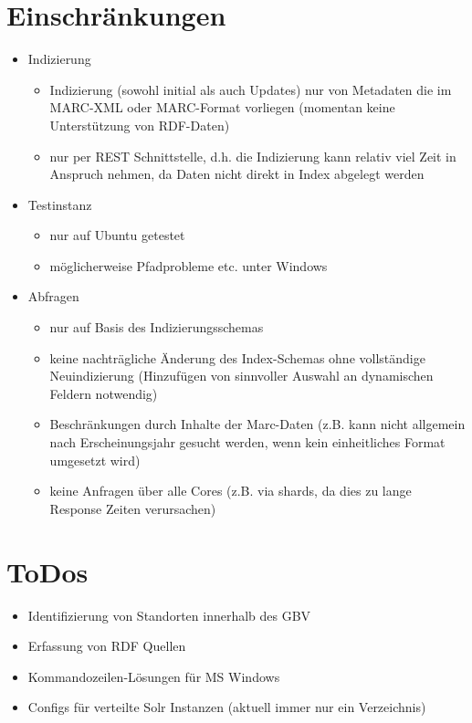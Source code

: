\documentclass[10pt]{article}
\begin{document}
\section{Einschränkungen}
\begin{itemize}
	\item Indizierung
	\begin{itemize}
		\item Indizierung (sowohl initial als auch Updates) nur von Metadaten die im MARC-XML oder MARC-Format vorliegen (momentan keine Unterstützung von RDF-Daten)
		\item nur per REST Schnittstelle, d.h. die Indizierung kann relativ viel Zeit in Anspruch nehmen, da Daten nicht direkt in Index abgelegt werden
	\end{itemize}
	
	
	\item Testinstanz
	\begin{itemize}
		\item nur auf Ubuntu getestet
		\item möglicherweise Pfadprobleme etc. unter Windows
	\end{itemize}
	
	\item Abfragen
	\begin{itemize}
		\item nur auf Basis des Indizierungsschemas %
		\item keine nachträgliche Änderung des Index-Schemas ohne vollständige Neuindizierung (Hinzufügen von sinnvoller Auswahl an dynamischen Feldern notwendig)
		\item Beschränkungen durch Inhalte der Marc-Daten (z.B. kann nicht allgemein nach Erscheinungsjahr gesucht werden, wenn kein einheitliches Format umgesetzt wird)
		\item keine Anfragen über alle Cores (z.B. via shards, da dies zu lange Response Zeiten verursachen)
		
	\end{itemize}
\end{itemize}

\section{ToDos}
\begin{itemize}
	\item Identifizierung von Standorten innerhalb des GBV
	\item Erfassung von RDF Quellen
	\item Kommandozeilen-Lösungen für MS Windows
	\item Configs für verteilte Solr Instanzen (aktuell immer nur ein Verzeichnis)
\end{itemize}
\newpage

\pagestyle{empty}

%
%
%

\end{document}
